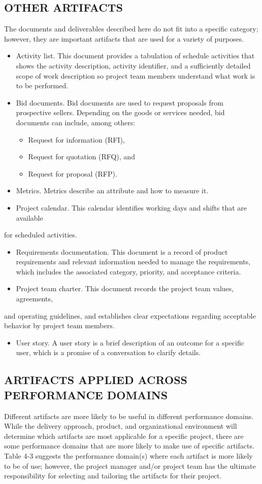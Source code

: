 \documentclass[11pt]{article}
\begin{document}
\subsection{OTHER ARTIFACTS}
\label{sec:orgde3b51f}
The documents and deliverables described here do not fit into a specific category; however, they are important artifacts that are used for a variety of purposes.
\begin{itemize}
\item Activity list. This document provides a tabulation of schedule activities that shows the activity description, activity identifier, and a sufficiently detailed scope of work description so project team members understand what work is to be performed.
\item Bid documents. Bid documents are used to request proposals from prospective sellers. Depending on the goods or services needed, bid documents can include, among others:
\begin{itemize}
\item Request for information (RFI),
\item Request for quotation (RFQ), and
\item Request for proposal (RFP).
\end{itemize}
\item Metrics. Metrics describe an attribute and how to measure it.
\item Project calendar. This calendar identifies working days and shifts that are available
\end{itemize}
for scheduled activities.
\begin{itemize}
\item Requirements documentation. This document is a record of product requirements and relevant information needed to manage the requirements, which includes the associated category, priority, and acceptance criteria.
\item Project team charter. This document records the project team values, agreements,
\end{itemize}
and operating guidelines, and establishes clear expectations regarding acceptable behavior by project team members.
\begin{itemize}
\item User story. A user story is a brief description of an outcome for a specific user, which is a promise of a conversation to clarify details.
\end{itemize}

\subsection{ARTIFACTS APPLIED ACROSS PERFORMANCE DOMAINS}
\label{sec:org1ff3fdd}
Different artifacts are more likely to be useful in different performance domains. While the delivery approach, product, and organizational environment will determine which artifacts are most applicable for a specific project, there are some performance domains that are more likely to make use of specific artifacts. Table 4-3 suggests the performance domain(s) where each artifact is more likely to be of use; however, the project manager and/or project team has the ultimate responsibility for selecting and tailoring the artifacts for their project.
\end{document}
